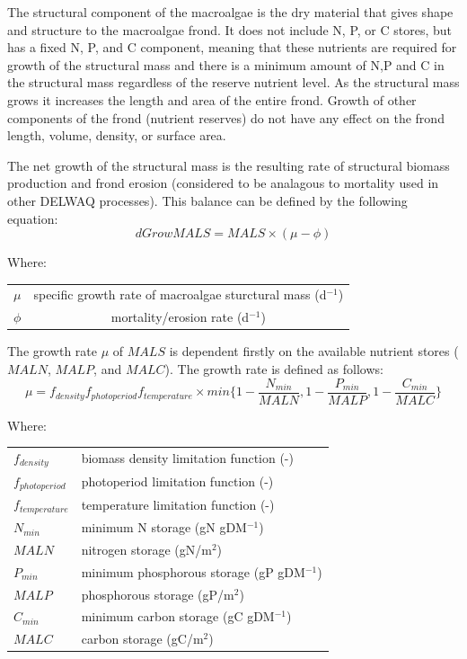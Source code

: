 \documentclass{deltares_manual}
\begin{document}
The structural component of the macroalgae is the dry material that gives shape and structure to the macroalgae frond. It does not include N, P, or C stores, but has a fixed N, P, and C component, meaning that these nutrients are required for growth of the structural mass and there is a minimum amount of N,P and C in the structural mass regardless of the reserve nutrient level. As the structural mass grows it increases the length and area of the entire frond. Growth of other components of the frond (nutrient reserves) do not have any effect on the frond length, volume, density, or surface area. 

The net growth of the structural mass is the resulting rate of structural biomass production and frond erosion (considered to be analagous to mortality used in other DELWAQ processes). This balance can be defined by the following equation:
\begin{equation}
	dGrowMALS =MALS \times (\mu - \phi)
\end{equation}

Where:\\
\begin{tabular}{cc}
	$\mu$  & specific growth rate of macroalgae sturctural mass (d$^{-1}$) \\
	$\phi$ & mortality/erosion rate (d$^{-1}$) \\
\end{tabular}

The growth rate $\mu$ of $MALS$ is dependent firstly on the available nutrient stores ($MALN$, $MALP$, and $MALC$). The growth rate is defined as follows:
\begin{equation}
	\mu = f_{density} f_{photoperiod} f_{temperature}\times min\big\{1-\frac{N_{min}}{MALN},1-\frac{P_{min}}{MALP},1-\frac{C_{min}}{MALC}\big\}
\end{equation}

Where:\\

\begin{tabular}{ll}
$f_{density}$ & biomass density limitation function (-)\\
$f_{photoperiod}$ & photoperiod limitation function (-)\\
$f_{temperature}$ & temperature limitation function (-)\\
$N_{min}$ & minimum N storage (gN gDM$^{-1}$)\\
$MALN$ & nitrogen storage (gN/m$^2$)\\
$P_{min}$ & minimum phosphorous storage (gP gDM$^{-1}$)\\
$MALP$ & phosphorous storage (gP/m$^2$)\\
$C_{min}$ & minimum carbon storage (gC gDM$^{-1}$)\\
$MALC$ & carbon storage (gC/m$^2$)\\
\end{tabular}
\end{document}
